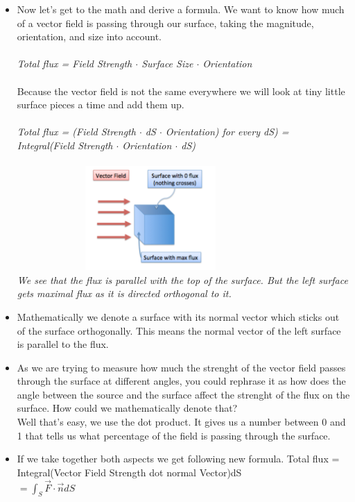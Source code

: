 \documentclass[12pt,a4paper]{article}
\begin{document}
\begin{itemize}
		\item Now let's get to the math and derive a formula. We want to know how much of a vector field is passing through our surface, taking the magnitude, orientation, and size into account. \\ \\
		\textit{Total flux = Field Strength $\cdot$ Surface Size $\cdot$ Orientation}\\ \\
		Because the vector field is not the same everywhere we will look at tiny little surface pieces a time and add them up.\\ \\
		\textit{Total flux = (Field Strength $\cdot$ dS $\cdot$ Orientation) for every dS) = \\ Integral(Field Strength $\cdot$ Orientation $\cdot$ dS)} \\  \\
		
		\includegraphics[width=0.8\textwidth, height = 150px]{flux.png}\\
		\textit{We see that the flux is parallel with the top of the surface. But the left surface gets maximal flux as it is directed orthogonal to it.}

		\item Mathematically we denote a surface with its normal vector which sticks out of the surface orthogonally. This means the normal vector of the left surface is parallel to the flux.
		\item As we are trying to measure how much the strenght of the vector field passes through the surface at different angles, you could rephrase it as how does the angle between the source and the surface affect the strenght of the flux on the surface. How could we mathematically denote that?\\
		Well that's easy, we use the dot product. It gives us a number between 0 and 1 that tells us what percentage of the field is passing through the surface.
		\item If we take together both aspects we get following new formula.
		Total flux = Integral(Vector Field Strength dot normal Vector)dS \\
		$= \int_{S}^{} \overrightarrow{F} \cdot \overrightarrow{n} dS$
		
		
		\end{itemize}
	
\end{document}
